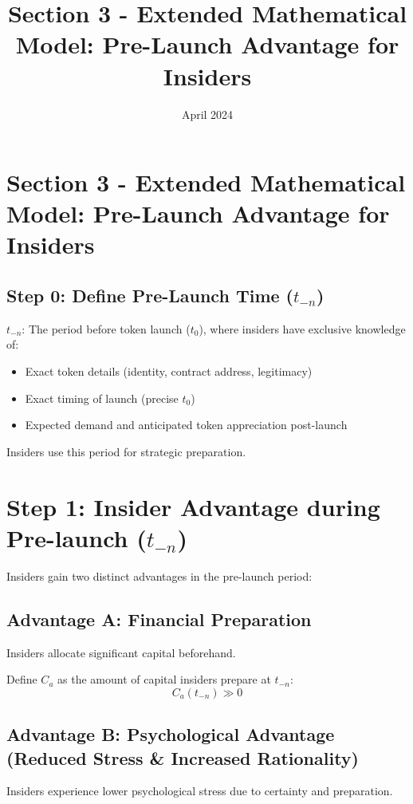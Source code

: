 \documentclass{article}
\title{Section 3 - Extended Mathematical Model: Pre-Launch Advantage for Insiders}
\date{April 2024}
\begin{document}

\section{Section 3 - Extended Mathematical Model: Pre-Launch Advantage for Insiders}
\subsection{Step 0: Define Pre-Launch Time ($t_{-n}$)}

\textbf{$t_{-n}$}: The period before token launch ($t_0$), where insiders have exclusive knowledge of:

\begin{itemize}
    \item Exact token details (identity, contract address, legitimacy)
    \item Exact timing of launch (precise $t_0$)
    \item Expected demand and anticipated token appreciation post-launch
\end{itemize}

Insiders use this period for strategic preparation.

\section{Step 1: Insider Advantage during Pre-launch ($t_{-n}$)}

Insiders gain two distinct advantages in the pre-launch period:

\subsection{Advantage A: Financial Preparation}

Insiders allocate significant capital beforehand.

Define $C_a$ as the amount of capital insiders prepare at $t_{-n}$:
\[
C_a(t_{-n}) \gg 0
\]

\subsection{Advantage B: Psychological Advantage (Reduced Stress & Increased Rationality)}

Insiders experience lower psychological stress due to certainty and preparation.
\end{document}
